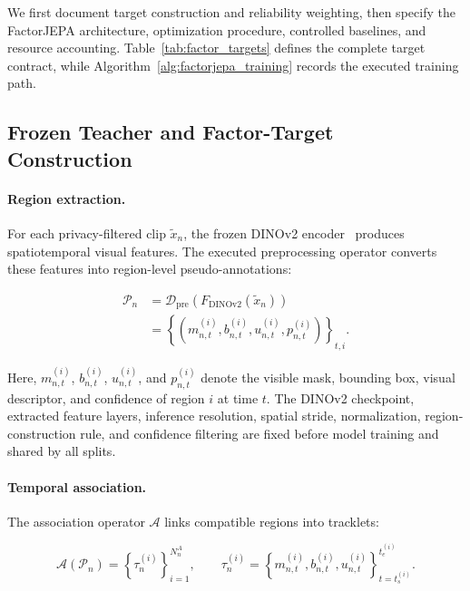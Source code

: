 We first document target construction and reliability weighting, then
specify the FactorJEPA architecture, optimization procedure, controlled
baselines, and resource accounting. Table~\ref{tab:factor_targets}
defines the complete target contract, while
Algorithm~\ref{alg:factorjepa_training} records the executed training
path.


\subsection{Frozen Teacher and Factor-Target Construction}
\label{app:factor_targets}

\paragraph{Region extraction.}
For each privacy-filtered clip \(\widetilde x_n\), the frozen DINOv2
encoder~\cite{oquab2024dinov2} produces spatiotemporal visual features.
The executed preprocessing operator converts these features into
region-level pseudo-annotations:

\begin{equation*}
\begin{aligned}
\mathcal P_n
&=
\mathcal D_{\mathrm{pre}}
\left(
F_{\mathrm{DINOv2}}(\widetilde x_n)
\right)
\\
&=
\left\{
\left(
m_{n,t}^{(i)},
b_{n,t}^{(i)},
u_{n,t}^{(i)},
p_{n,t}^{(i)}
\right)
\right\}_{t,i}.
\end{aligned}
\end{equation*}

Here, \(m_{n,t}^{(i)}\), \(b_{n,t}^{(i)}\),
\(u_{n,t}^{(i)}\), and \(p_{n,t}^{(i)}\) denote the visible mask,
bounding box, visual descriptor, and confidence of region \(i\) at
time \(t\). The DINOv2 checkpoint, extracted feature layers, inference
resolution, spatial stride, normalization, region-construction rule,
and confidence filtering are fixed before model training and shared by
all splits.

\paragraph{Temporal association.}
The association operator \(\mathcal A\) links compatible regions into
tracklets:

\begin{equation*}
\mathcal A(\mathcal P_n)
=
\left\{
\tau_n^{(i)}
\right\}_{i=1}^{N_n^A},
\qquad
\tau_n^{(i)}
=
\left\{
m_{n,t}^{(i)},
b_{n,t}^{(i)},
u_{n,t}^{(i)}
\right\}_{t=t_s^{(i)}}^{t_e^{(i)}} .
\end{equation*}

